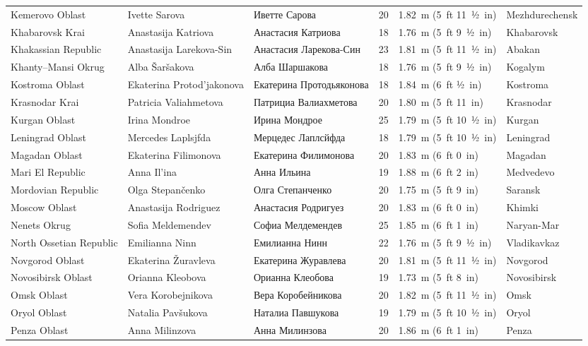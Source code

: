 \documentclass{article}
\begin{document}
\begin{tabular}{llllll}
Kemerovo Oblast & Ivette Sarova & Иветте Сарова & 20 & 1.82 m (5 ft 11 1⁄2 in) & Mezhdurechensk \\
Khabarovsk Krai & Anastasija Katriova & Анастасия Катриова & 18 & 1.76 m (5 ft 9 1⁄2 in) & Khabarovsk \\
Khakassian Republic & Anastasija Larekova-Sin & Анастасия Ларекова-Син & 23 & 1.81 m (5 ft 11 1⁄2 in) & Abakan \\
Khanty–Mansi Okrug & Alba Šaršakova & Алба Шаршакова & 18 & 1.76 m (5 ft 9 1⁄2 in) & Kogalym \\
Kostroma Oblast & Ekaterina Protod’jakonova & Екатерина Протодьяконова & 18 & 1.84 m (6 ft 1⁄2 in) & Kostroma \\
Krasnodar Krai & Patricia Valiahmetova & Патрициа Валиахметова & 20 & 1.80 m (5 ft 11 in) & Krasnodar \\
Kurgan Oblast & Irina Mondroe & Ирина Мондрое & 25 & 1.79 m (5 ft 10 1⁄2 in) & Kurgan \\
Leningrad Oblast & Mercedes Laplsjfda & Мерцедес Лаплсйфда & 18 & 1.79 m (5 ft 10 1⁄2 in) & Leningrad \\
Magadan Oblast & Ekaterina Filimonova & Екатерина Филимонова & 20 & 1.83 m (6 ft 0 in) & Magadan \\
Mari El Republic & Anna Il’ina & Анна Ильина & 19 & 1.88 m (6 ft 2 in) & Medvedevo \\
Mordovian Republic & Olga Stepančenko & Олга Степанченко & 20 & 1.75 m (5 ft 9 in) & Saransk \\
Moscow Oblast & Anastasija Rodriguez & Анастасия Родригуез & 20 & 1.83 m (6 ft 0 in) & Khimki \\
Nenets Okrug & Sofia Meldemendev & Софиа Мелдемендев & 25 & 1.85 m (6 ft 1 in) & Naryan-Mar \\
North Ossetian Republic & Emilianna Ninn & Емилианна Нинн & 22 & 1.76 m (5 ft 9 1⁄2 in) & Vladikavkaz \\
Novgorod Oblast & Ekaterina Žuravleva & Екатерина Журавлева & 20 & 1.81 m (5 ft 11 1⁄2 in) & Novgorod \\
Novosibirsk Oblast & Orianna Kleobova & Орианна Клеобова & 19 & 1.73 m (5 ft 8 in) & Novosibirsk \\
Omsk Oblast & Vera Korobejnikova & Вера Коробейникова & 20 & 1.82 m (5 ft 11 1⁄2 in) & Omsk \\
Oryol Oblast & Natalia Pavšukova & Наталиа Павшукова & 19 & 1.79 m (5 ft 10 1⁄2 in) & Oryol \\
Penza Oblast & Anna Milinzova & Анна Милинзова & 20 & 1.86 m (6 ft 1 in) & Penza \\

\end{tabular}
\end{document}
